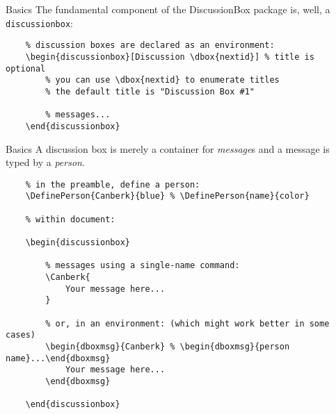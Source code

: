 \documentclass{article}
\begin{document}
\begin{discussionbox}

    \begin{dboxmsg}{Basics}
        The fundamental component of the DiscussionBox package is, well, a \texttt{discussionbox}:
        \begin{verbatim}
    % discussion boxes are declared as an environment:
    \begin{discussionbox}[Discussion \dbox{nextid}] % title is optional
        % you can use \dbox{nextid} to enumerate titles
        % the default title is "Discussion Box #1"

        % messages...
    \end{discussionbox}
        \end{verbatim}
    \end{dboxmsg}

    \begin{dboxmsg}{Basics}
        A discussion box is merely a container for \textit{message}s and a message is typed by a \textit{person}.

        \begin{verbatim}
    % in the preamble, define a person:
    \DefinePerson{Canberk}{blue} % \DefinePerson{name}{color}
    
    % within document:

    \begin{discussionbox}

        % messages using a single-name command:
        \Canberk{
            Your message here...
        }

        % or, in an environment: (which might work better in some cases)
        \begin{dboxmsg}{Canberk} % \begin{dboxmsg}{person name}...\end{dboxmsg}
            Your message here...
        \end{dboxmsg}

    \end{discussionbox}
        \end{verbatim}
    

\end{dboxmsg}
\end{discussionbox}
\end{document}
